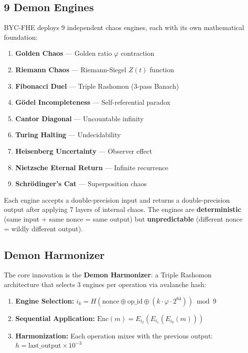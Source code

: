 \documentclass[11pt,a4paper]{article}
\begin{document}
\subsection{9 Demon Engines}

BYC-FHE deploys 9 independent chaos engines, each with its own mathematical foundation:

\begin{enumerate}
\item \textbf{Golden Chaos} — Golden ratio $\varphi$ contraction
\item \textbf{Riemann Chaos} — Riemann-Siegel $Z(t)$ function
\item \textbf{Fibonacci Duel} — Triple Rashomon (3-pass Banach)
\item \textbf{G\"odel Incompleteness} — Self-referential paradox
\item \textbf{Cantor Diagonal} — Uncountable infinity
\item \textbf{Turing Halting} — Undecidability
\item \textbf{Heisenberg Uncertainty} — Observer effect
\item \textbf{Nietzsche Eternal Return} — Infinite recurrence
\item \textbf{Schr\"odinger's Cat} — Superposition chaos
\end{enumerate}

Each engine accepts a double-precision input and returns a double-precision output after applying 7 layers of internal chaos. The engines are \textbf{deterministic} (same input + same nonce = same output) but \textbf{unpredictable} (different nonce = wildly different output).

\subsection{Demon Harmonizer}

The core innovation is the \textbf{Demon Harmonizer}: a Triple Rashomon architecture that selects 3 engines per operation via avalanche hash:

\begin{enumerate}
\item \textbf{Engine Selection:} $i_k = H(\text{nonce} \oplus \text{op\_id} \oplus (k \cdot \varphi \cdot 2^{64})) \bmod 9$
\item \textbf{Sequential Application:} $\text{Enc}(m) = E_{i_2}(E_{i_1}(E_{i_0}(m)))$
\item \textbf{Harmonization:} Each operation mixes with the previous output: $h = \text{last\_output} \times 10^{-3}$
\end{enumerate}
\end{document}
